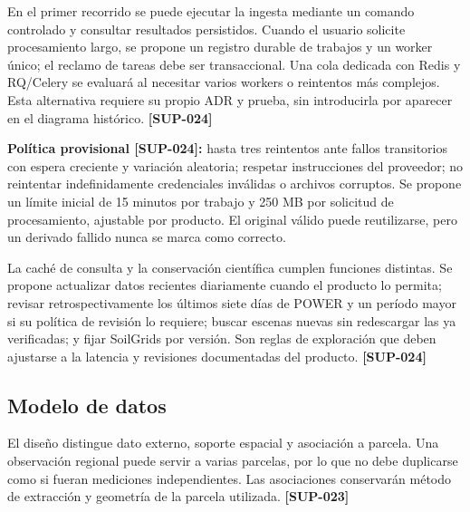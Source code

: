 \documentclass[10pt,a4paper]{article}
\begin{document}
En el primer recorrido se puede ejecutar la ingesta mediante un comando controlado y consultar resultados persistidos. Cuando el usuario solicite procesamiento largo, se propone un registro durable de trabajos y un worker único; el reclamo de tareas debe ser transaccional. Una cola dedicada con Redis y RQ/\allowbreak{}Celery se evaluará al necesitar varios workers o reintentos más complejos. Esta alternativa requiere su propio ADR y prueba, sin introducirla por aparecer en el diagrama histórico. \textbf{[SUP-024]}


\textbf{Política provisional [SUP-024]:} hasta tres reintentos ante fallos transitorios con espera creciente y variación aleatoria; respetar instrucciones del proveedor; no reintentar indefinidamente credenciales inválidas o archivos corruptos. Se propone un límite inicial de 15 minutos por trabajo y 250 MB por solicitud de procesamiento, ajustable por producto. El original válido puede reutilizarse, pero un derivado fallido nunca se marca como correcto.


La caché de consulta y la conservación científica cumplen funciones distintas. Se propone actualizar datos recientes diariamente cuando el producto lo permita; revisar retrospectivamente los últimos siete días de POWER y un período mayor si su política de revisión lo requiere; buscar escenas nuevas sin redescargar las ya verificadas; y fijar SoilGrids por versión. Son reglas de exploración que deben ajustarse a la latencia y revisiones documentadas del producto. \textbf{[SUP-024]}


\subsection{Modelo de datos}

El diseño distingue dato externo, soporte espacial y asociación a parcela. Una observación regional puede servir a varias parcelas, por lo que no debe duplicarse como si fueran mediciones independientes. Las asociaciones conservarán método de extracción y geometría de la parcela utilizada. \textbf{[SUP-023]}
\end{document}
